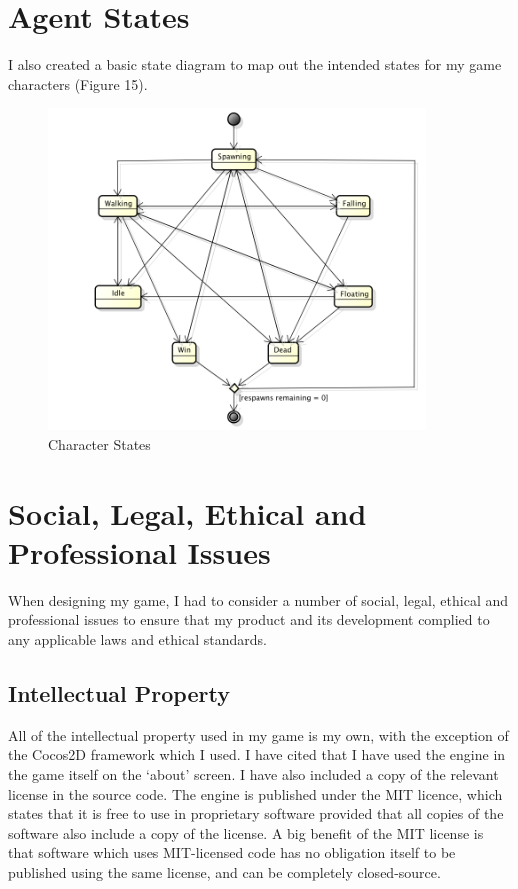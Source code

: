 \documentclass[a4paper,oneside]{report}
\begin{document}
\section{Agent States}

I also created a basic state diagram to map out the intended states for my game characters (Figure 15).

\begin{figure}[h!]
  \centering
    \includegraphics[width=100mm]{sources/images/LemmingStatemachine}
    \caption{Character States}
\end{figure}
	
	
\section{Social, Legal, Ethical and Professional Issues}

When designing my game, I had to consider a number of social, legal, ethical and professional issues to ensure that my product and its development complied to any applicable laws and ethical standards.

\subsection{Intellectual Property}

All of the intellectual property used in my game is my own, with the exception of the Cocos2D framework which I used. I have cited that I have used the engine in the game itself on the `about' screen. I have also included a copy of the relevant license in the source code. The engine is published under the MIT licence, which states that it is free to use in proprietary software provided that all copies of the software also include a copy of the license. A big benefit of the MIT license is that software which uses MIT-licensed code has no obligation itself to be published using the same license, and can be completely closed-source.
\end{document}
